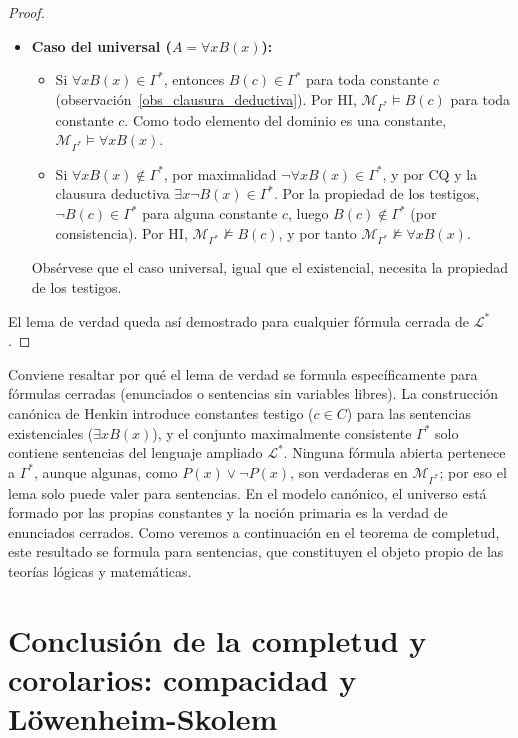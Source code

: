 \begin{proof}
\begin{itemize}
    \item \textbf{Caso del universal ($A = \forall x B(x)$):} 
    \begin{itemize}
        \item [$(\Leftarrow)$] Si $\forall x B(x) \in \Gamma^*$, entonces $B(c) \in \Gamma^*$ para toda constante $c$ (observación~\ref{obs_clausura_deductiva}). Por HI, $\mathcal{M}_{\Gamma^*} \models B(c)$ para toda constante $c$. Como todo elemento del dominio es una constante, $\mathcal{M}_{\Gamma^*} \models \forall x B(x)$.
        \item [$(\Rightarrow)$] Si $\forall x B(x) \notin \Gamma^*$, por maximalidad $\neg \forall x B(x) \in \Gamma^*$, y por CQ y la clausura deductiva $\exists x \neg B(x) \in \Gamma^*$. Por la propiedad de los testigos, $\neg B(c) \in \Gamma^*$ para alguna constante $c$, luego $B(c) \notin \Gamma^*$ (por consistencia). Por HI, $\mathcal{M}_{\Gamma^*} \not\models B(c)$, y por tanto $\mathcal{M}_{\Gamma^*} \not\models \forall x B(x)$.
    \end{itemize}
    Obsérvese que el caso universal, igual que el existencial, necesita la propiedad de los testigos.
\end{itemize}
El lema de verdad queda así demostrado para cualquier fórmula cerrada de $\mathcal{L}^*$.
\end{proof}

\begin{observacion}\label{obs_cerradas_henkin}
Conviene resaltar por qué el lema de verdad se formula específicamente
para fórmulas cerradas (enunciados o sentencias sin variables
libres). La construcción canónica de Henkin introduce constantes
testigo ($c \in C$) para las sentencias existenciales ($\exists
x B(x)$), y el conjunto maximalmente consistente $\Gamma^*$
solo contiene sentencias del lenguaje ampliado
$\mathcal{L}^*$. Ninguna fórmula abierta pertenece a $\Gamma^*$, aunque algunas, como $P(x) \lor \neg P(x)$, son verdaderas en $\mathcal{M}_{\Gamma^*}$; por eso el lema solo puede valer para sentencias. En el modelo canónico, el universo está formado por
las propias constantes y la noción primaria es la verdad de enunciados
cerrados. Como veremos a continuación en el teorema de completud, este resultado se formula para sentencias, que constituyen el objeto propio de las teorías lógicas y matemáticas.
\end{observacion}

\section[Corolarios de la completud: compacidad y
Löwenheim-Skolem]{Conclusión de la completud y corolarios: compacidad
  y\\ Löwenheim-Skolem}

